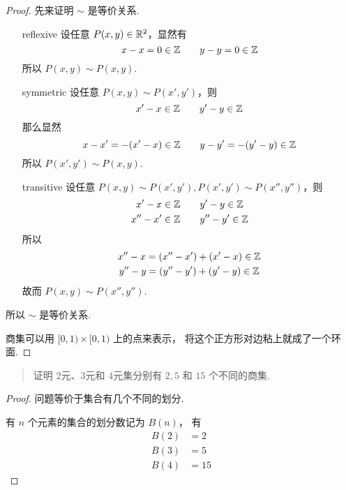 \begin{proof}
先来证明 $\sim$ 是等价关系.

\begin{enumerate}
    \item[reflexive] 设任意 $P(x,y) \in \mathbb{R}^2$，显然有
    \begin{equation}
        x - x = 0 \in \mathbb{Z} \qquad y - y = 0 \in \mathbb{Z}
    \end{equation}
    所以 $P(x,y) \sim P(x,y)$.
    
    \item[symmetric] 设任意 $P(x,y) \sim P(x', y')$，则
    \begin{equation}
        x' - x \in \mathbb{Z} \qquad y' - y \in \mathbb{Z}
    \end{equation}
    那么显然
    \begin{equation}
        x - x' = -(x' - x) \in \mathbb{Z} \qquad
        y - y' = -(y' - y) \in \mathbb{Z}
    \end{equation}
    所以 $P(x', y') \sim P(x, y)$.
    
    \item[transitive] 设任意 $P(x,y) \sim P(x', y'), P(x', y') \sim P(x'', y'')$，则
    \begin{gather}
        x' - x \in \mathbb{Z} \qquad y' - y \in \mathbb{Z} \\
        x'' - x' \in \mathbb{Z} \qquad y'' - y' \in \mathbb{Z}
    \end{gather}
    所以
    \begin{gather}
        x'' - x = (x'' - x') + (x' - x) \in \mathbb{Z} \\
        y'' - y = (y'' - y') + (y' - y) \in \mathbb{Z}
    \end{gather}
    故而 $P(x,y) \sim P(x'', y'')$.
\end{enumerate}
所以 $\sim$ 是等价关系.

商集可以用 $[0,1) \times [0,1)$ 上的点来表示，
将这个正方形对边粘上就成了一个环面.

\end{proof}


\begin{quotation}
    证明 $2$元、$3$元和 $4$元集分别有
    $2, 5$ 和 $15$ 个不同的商集.
\end{quotation}

\begin{proof}
问题等价于集合有几个不同的划分.

有 $n$ 个元素的集合的划分数记为 $B(n)$，
有
\begin{align}
    B(2) &= 2 \\
    B(3) &= 5 \\
    B(4) &= 15
\end{align}
\end{proof}

